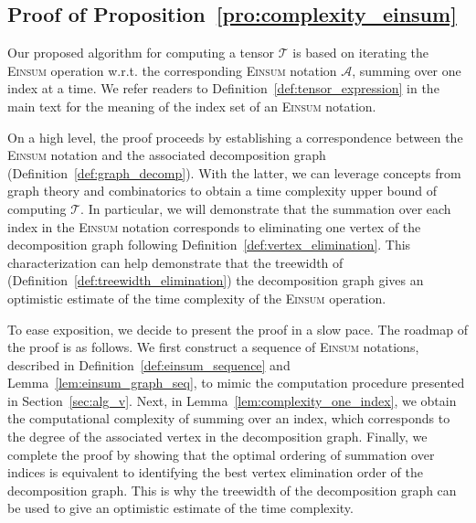 \documentclass[sn-mathphys, natbib=false]{sn-jnl}
\theoremstyle{plain}
\theoremstyle{definition}
\def\Einsum{\textsc{Einsum}}
\def\calA{\mathcal{A}}
\def\calT{\mathcal{T}}
\begin{document}
\begin{bibunit}[agsm]
\section{Proof of Proposition~\ref{pro:complexity_einsum}}
\label{app:complexity_einsum}

Our proposed algorithm for computing a tensor $\calT$ is based on iterating the \Einsum{} operation w.r.t. the corresponding \Einsum{} notation $\calA$, summing over one index at a time. We refer readers to Definition~\ref{def:tensor_expression} in the main text for the meaning of the index set of an \Einsum{} notation. 

On a high level, the proof proceeds by establishing a correspondence between the \Einsum{} notation and the associated decomposition graph (Definition~\ref{def:graph_decomp}). With the latter, we can leverage concepts from graph theory and combinatorics to obtain a time complexity upper bound of computing $\calT$. In particular, we will demonstrate that the summation over each index in the \Einsum{} notation corresponds to eliminating one vertex of the decomposition graph following Definition~\ref{def:vertex_elimination}. This characterization can help demonstrate that the treewidth of (Definition~\ref{def:treewidth_elimination}) the decomposition graph gives an optimistic estimate of the time complexity of the \Einsum{} operation.

To ease exposition, we decide to present the proof in a slow pace. The roadmap of the proof is as follows. We first construct a sequence of \Einsum{} notations, described in Definition~\ref{def:einsum_sequence} and Lemma~\ref{lem:einsum_graph_seq}, to mimic the computation procedure presented in Section~\ref{sec:alg_v}. Next, in Lemma~\ref{lem:complexity_one_index}, we obtain the computational complexity of summing over an index, which corresponds to the degree of the associated vertex in the decomposition graph. Finally, we complete the proof by showing that the optimal ordering of summation over indices is equivalent to identifying the best vertex elimination order of the decomposition graph. This is why the treewidth of the decomposition graph can be used to give an optimistic estimate of the time complexity.



\end{bibunit}
\end{document}
